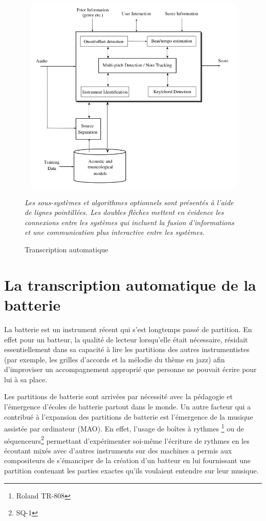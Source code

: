 \begin{figure}[!h]
	\centering
	\includegraphics[height=95mm, width=130mm]{z_images/1_contexte/1_general_process.png}
	\caption{Transcription automatique}
	\label{AMT_presentation}
	\textit{Les sous-systèmes et algorithmes optionnels sont présentés à l’aide
    de lignes pointillées. Les doubles flèches mettent en évidence les
connexions entre les systèmes qui incluent la fusion d’informations et une
communication plus interactive entre les systèmes.}
\end{figure}%
{}
\section{La transcription automatique de la batterie}
La batterie est un instrument récent qui s’est longtemps passé de partition. En
effet pour un batteur, la qualité de lecteur lorsqu’elle était nécessaire,
résidait essentiellement dans sa capacité à lire les partitions des autres
instrumentistes (par exemple, les grilles d’accords et la mélodie du thème en
jazz) afin d’improviser un accompagnement approprié que personne ne pouvait
écrire pour lui à sa place.

Les partitions de batterie sont arrivées par nécessité avec la pédagogie et
l’émergence d’écoles de batterie partout dans le monde. 
Un autre facteur qui a
contribué à l’expansion des partitions de batterie est l’émergence de la
musique assistée par ordinateur (MAO). En effet, l’usage de boîtes à rythmes
\footnote{Roland TR-808} ou de séquenceurs\footnote{SQ-1} permettant
d’expérimenter soi-même l’écriture de rythmes en les écoutant mixés avec
d’autres instruments sur des machines a permis aux compositeurs de s’émanciper
de la création d’un batteur en lui fournissant une partition contenant les
parties exactes qu’ils voulaient entendre sur leur musique.

